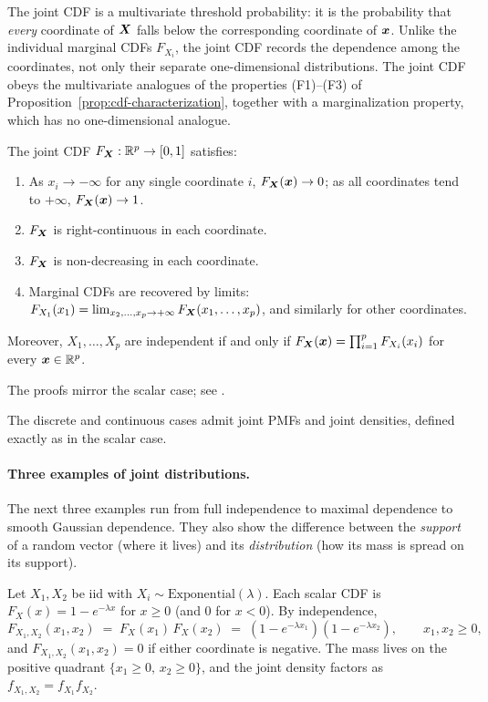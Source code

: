 The joint CDF is a multivariate threshold probability: it is the probability that \emph{every} coordinate of \(\bm{X}\) falls below the corresponding coordinate of \(\bm{x}\). Unlike the individual marginal CDFs \(F_{X_i}\), the joint CDF records the dependence among the coordinates, not only their separate one-dimensional distributions. The joint CDF obeys the multivariate analogues of the properties (F1)--(F3) of Proposition~\ref{prop:cdf-characterization}, together with a marginalization property, which has no one-dimensional analogue.

\begin{proposition}\label{prop:joint-cdf}
The joint CDF \(F_{\bm{X}}: \mathbb{R}^p \to [0, 1]\) satisfies:
\begin{enumerate}[label=\textnormal{(F\arabic*)},leftmargin=*]
  \item As \(x_i \to -\infty\) for any single coordinate \(i\), \(F_{\bm{X}}(\bm{x}) \to 0\); as all coordinates tend to \(+\infty\), \(F_{\bm{X}}(\bm{x}) \to 1\).
  \item \(F_{\bm{X}}\) is right-continuous in each coordinate.
  \item \(F_{\bm{X}}\) is non-decreasing in each coordinate.
  \item Marginal CDFs are recovered by limits: \(F_{X_1}(x_1) = \lim_{x_2, \ldots, x_p \to +\infty} F_{\bm{X}}(x_1, \ldots, x_p)\), and similarly for other coordinates.
\end{enumerate}
Moreover, \(X_1, \ldots, X_p\) are independent if and only if \(F_{\bm{X}}(\bm{x}) = \prod_{i=1}^p F_{X_i}(x_i)\) for every \(\bm{x} \in \mathbb{R}^p\).
\end{proposition}

The proofs mirror the scalar case; see \citet[][\S~4.1]{Casella2002}.

The discrete and continuous cases admit joint PMFs and joint densities, defined exactly as in the scalar case.

\paragraph{Three examples of joint distributions.}
The next three examples run from full independence to maximal dependence to smooth Gaussian dependence. They also show the difference between the \emph{support} of a random vector (where it lives) and its \emph{distribution} (how its mass is spread on its support).

\begin{example}\label{ex:indep-expon}
Let \(X_1, X_2\) be iid with \(X_i \sim \mathrm{Exponential}(\lambda)\). Each scalar CDF is \(F_X(x) = 1 - e^{-\lambda x}\) for \(x \ge 0\) (and \(0\) for \(x < 0\)). By independence,
\[
  F_{X_1, X_2}(x_1, x_2) \;=\; F_X(x_1)\, F_X(x_2) \;=\; (1 - e^{-\lambda x_1})(1 - e^{-\lambda x_2}), \qquad x_1, x_2 \ge 0,
\]
and \(F_{X_1, X_2}(x_1, x_2) = 0\) if either coordinate is negative. The mass lives on the positive quadrant \(\{x_1 \ge 0,\, x_2 \ge 0\}\), and the joint density factors as \(f_{X_1, X_2} = f_{X_1} f_{X_2}\).
\end{example}

